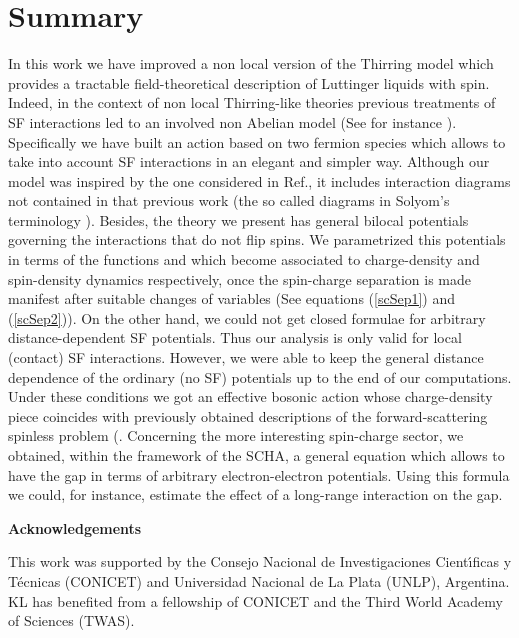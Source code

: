 \documentclass[a4paper,a4paper]{article}
\begin{document}
\section{Summary}
In this work we have improved a non local version of the Thirring model which provides
a tractable field-theoretical description of Luttinger liquids with spin. Indeed, in
the context of non local Thirring-like theories previous treatments of SF interactions
led to an involved non Abelian model (See for instance \cite{NLT1}). Specifically we
have built an action based on two fermion species which allows to take into account SF
interactions in an elegant and simpler way. Although our model was inspired by the one
considered in Ref.\cite{Zinn-Justin}, it includes interaction diagrams not contained
in that previous work (the so called \coordHE{} diagrams in Solyom's terminology
\cite{Solyom}). Besides, the theory we present has general bilocal potentials
governing the interactions that do not flip spins. We parametrized this potentials in
terms of the functions \coordHE{} and \coordHE{} which become associated to charge-density and
spin-density dynamics respectively, once the spin-charge separation is made manifest
after suitable changes of variables (See equations (\ref{scSep1}) and (\ref{scSep2})).
On the other hand, we could not get closed formulae for arbitrary distance-dependent
SF potentials. Thus our analysis is only valid for local (contact) SF interactions.
However, we were able to keep the general distance dependence of the ordinary (no SF)
potentials up to the end of our computations. Under these conditions we got an
effective bosonic action whose charge-density piece coincides with previously obtained
descriptions of the forward-scattering spinless problem (\cite{NLT1}. Concerning the
more interesting spin-charge sector, we obtained, within the framework of the SCHA, a
general equation which allows to have the gap in terms of arbitrary electron-electron
potentials. Using this formula we could, for instance, estimate the effect of a
long-range interaction on the gap. \vspace{0.5cm}

{\bf Acknowledgements}

This work was supported by the Consejo Nacional de Investigaciones Cient\'{\i}ficas y
T\'ecnicas (CONICET) and Universidad Nacional de La Plata (UNLP), Argentina. KL has
benefited from a fellowship of CONICET and the Third World Academy of Sciences (TWAS).
\end{document}
